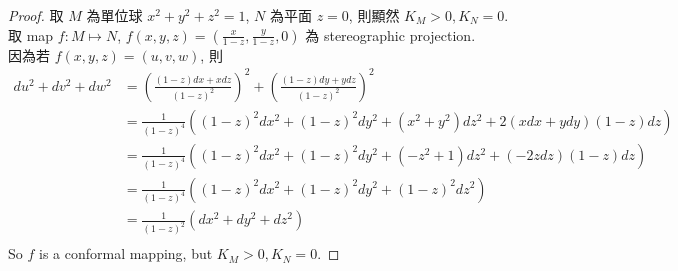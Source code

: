 \documentclass[10pt,a4paper]{article}
\begin{document}
\begin{proof}
取 $M$ 為單位球 $x^2+y^2+z^2=1$, $N$ 為平面 $z=0$, 則顯然 $K_M>0, K_N=0$.\\
取 map $f: M\mapsto N$, $f(x,y,z)=(\frac{x}{1-z},\frac{y}{1-z},0)$ 為 stereographic projection.\\
因為若 $f(x,y,z)=(u,v,w)$, 則
\begin{align*}
du^2+dv^2+dw^2&=\left(\frac{(1-z)dx+x dz}{(1-z)^2}\right)^2+\left(\frac{(1-z)dy+y dz}{(1-z)^2}\right)^2\\
&=\frac{1}{(1-z)^4}\left((1-z)^2dx^2+(1-z)^2dy^2+(x^2+y^2)dz^2+2(xdx+ydy)(1-z)dz\right)\\
&=\frac{1}{(1-z)^4}\left((1-z)^2dx^2+(1-z)^2dy^2+(-z^2+1)dz^2+(-2zdz)(1-z)dz\right)\\
&=\frac{1}{(1-z)^4}\left((1-z)^2dx^2+(1-z)^2dy^2+(1-z)^2dz^2\right)\\
&=\frac{1}{(1-z)^2}\left(dx^2+dy^2+dz^2\right)\\
\end{align*}
So $f$ is a conformal mapping, but $K_M>0, K_N=0$.
\end{proof}
\end{document}

